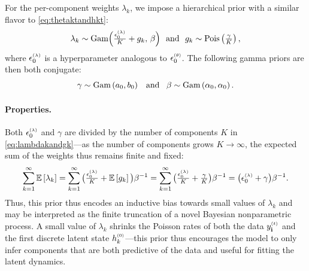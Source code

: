 \documentclass{article}
\begin{document}
For the per-component weights $\lambda_k$, we impose a hierarchical prior with a similar flavor to \cref{eq:thetaktandhkt}:~ 
\begin{equation}
\label{eq:lambdakandgk}
\lambda_k \sim \textrm{Gam}\Big(\tfrac{\epslambda}{K} + g_k,\, \beta\Big) \,\,\textrm{ and }\,\,g_k \sim \Pois{\tfrac{\gamma}{K}},
% 
\end{equation}
where $\epslambda$ is a hyperparameter analogous to $\epstheta$. The following gamma priors are then both conjugate:~
\begin{equation}
\gamma \sim \textrm{Gam}\left( a_0,b_0 \right) \,\,\,\textrm{ and }\,\,\, \beta \sim \textrm{Gam}\left( \alpha_0, \alpha_0 \right).
\end{equation}
\paragraph{Properties.}
Both $\epslambda$ and $\gamma$ are divided by the number of components $K$ in \cref{eq:lambdakandgk}---as the number of components grows $K \!\rightarrow\! \infty$, the expected sum of the weights thus remains finite and fixed:~
\begin{equation}
\sum_{k=1}^\infty \E{\lambda_k} = \sum_{k=1}^\infty \big(\tfrac{\epslambda}{K} + \E{g_k}\big) \beta^{-1} = \sum_{k=1}^\infty \big(\tfrac{\epslambda}{K} + \tfrac{\gamma}{K} \big)\beta^{-1} = \big(\epslambda + \gamma \big)\beta^{-1}.
\end{equation}
Thus, this prior thus encodes an inductive bias towards small values of $\lambda_k$ and may be interpreted as the finite truncation of a novel Bayesian nonparametric process. A small value of $\lambda_k$ shrinks the Poisson rates of both the data $\ydt$ and the first discrete latent state $h^{\mathsmaller{(0)}}_k$---this prior thus encourages the model to only infer components that are both predictive of the data and useful for fitting the latent dynamics.~
\end{document}
